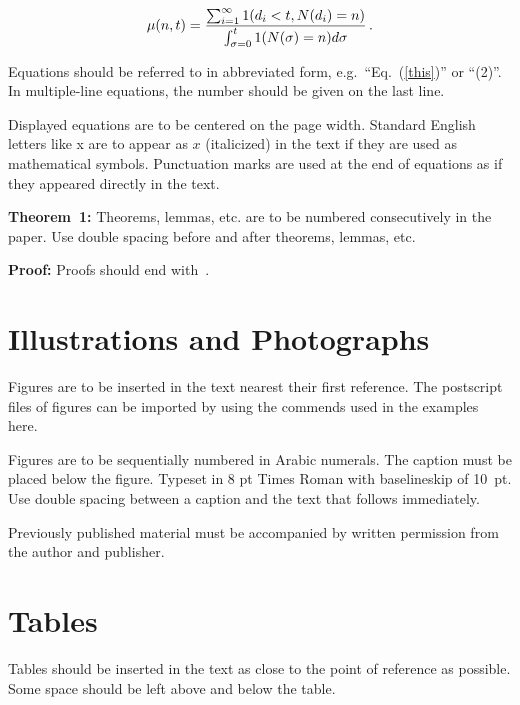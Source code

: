\documentclass[twoside]{article}
\begin{document}
\begin{equation}
\mu(n, t) = {
\sum^\infty_{i=1} 1(d_i < t, N(d_i) = n) \over \int^t_{\sigma=0} 1(N(\sigma) 
= n)d\sigma}\,. \label{this}
\end{equation}

Equations should be referred to in abbreviated form,
e.g.~``Eq.~(\ref{this})'' or ``(2)''. In multiple-line
equations, the number should be given on the last line.

Displayed equations are to be centered on the page width.
Standard English letters like x are to appear as $x$
(italicized) in the text if they are used as mathematical
symbols. Punctuation marks are used at the end of equations as
if they appeared directly in the text.

\vspace*{12pt}
\noindent
{\bf Theorem~1:} Theorems, lemmas, etc. are to be numbered
consecutively in the paper. Use double spacing before and after
theorems, lemmas, etc.

\vspace*{12pt}
\noindent
{\bf Proof:} Proofs should end with \square\,.

\section{Illustrations and Photographs}
\noindent
Figures are to be inserted in the text nearest their first
reference. The postscript files of figures can be imported by using
the commends used in the examples here.

\begin{figure} [htbp]
\centerline{} %
\vspace*{13pt}
\end{figure}

Figures are to be sequentially numbered in Arabic numerals. The
caption must be placed below the figure. Typeset in 8 pt Times
Roman with baselineskip of 10~pt. Use double spacing between a
caption and the text that follows immediately.

Previously published material must be accompanied by written
permission from the author and publisher.

\section{Tables}
\noindent
Tables should be inserted in the text as close to the point of
reference as possible. Some space should be left above and below
the table.
\end{document}
